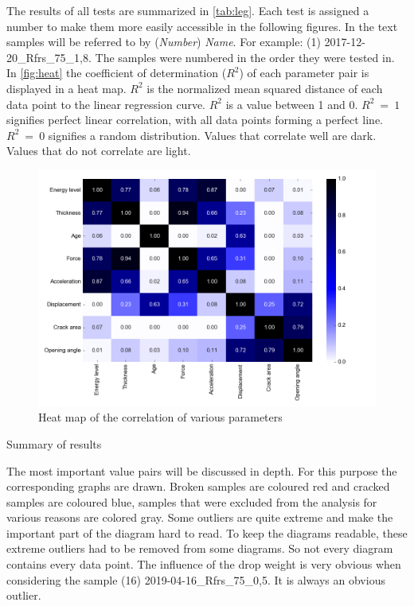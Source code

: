 The results of all tests are summarized in \autoref{tab:leg}. Each test is assigned a number to make them more easily accessible in the following figures. In the text samples will be referred to by (\textit{Number}) \textit{Name}. 
For example: (1) 2017-12-20\_Rfrs\_75\_1,8. The samples were numbered in the order they were tested in.
In \autoref{fig:heat} the coefficient of determination (\(R^2\)) of each parameter pair is displayed in a heat map. \(R^2\) is the normalized mean squared distance of each data point to the linear regression curve. \(R^2\) is a value between 1 and 0. \(R^2~=~1\) signifies perfect linear correlation, with all data points forming a perfect line.
\(R^2~=~0\) signifies a random distribution.
Values that correlate well are dark. Values that do not correlate are light.

\begin{figure}[h]
    \centering
    \includegraphics[width = 0.95\linewidth]{diagram/heatmap.png}
    \caption{Heat map of the correlation of various parameters}
    \label{fig:heat}
\end{figure}

\begin{landscape}
\begin{table}
    \centering

\caption{Summary of results}
              \label{tab:leg}
              \end{table}
\end{landscape}



The most important value pairs will be discussed in depth. For this purpose the corresponding graphs are drawn. Broken samples are coloured red and cracked samples are coloured blue, samples that were excluded from the analysis for various reasons are colored gray. 
Some outliers are quite extreme and make the important part of the diagram hard to read. To keep the diagrams readable, these extreme outliers had to be removed from some diagrams. So not every diagram contains every data point. The influence of the drop weight is very obvious when considering the sample (16) 2019-04-16\_Rfrs\_75\_0,5. It is always an obvious outlier.

